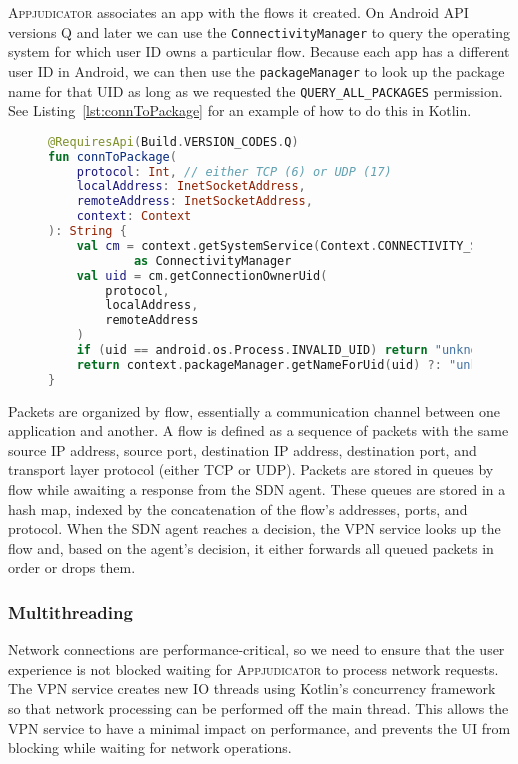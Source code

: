\textsc{Appjudicator} associates an app with the flows it created.  On Android
API versions Q and later we can use the \texttt{ConnectivityManager} to query
the operating system for which user ID owns a particular flow. Because each app
has a different user ID in Android, we can then use the \texttt{packageManager}
to look up the package name for that UID as long as we requested the
\texttt{QUERY\_ALL\_PACKAGES} permission. See Listing~\ref{lst:connToPackage}
for an example of how to do this in Kotlin.

\begin{figure}[h]
\begin{lstlisting}[caption={Source code to obtain the package that created a
		given network flow.},
	label={lst:connToPackage}, language=Kotlin]
@RequiresApi(Build.VERSION_CODES.Q)
fun connToPackage(
    protocol: Int, // either TCP (6) or UDP (17)
    localAddress: InetSocketAddress,
    remoteAddress: InetSocketAddress,
    context: Context
): String {
	val cm = context.getSystemService(Context.CONNECTIVITY_SERVICE)
			as ConnectivityManager
	val uid = cm.getConnectionOwnerUid(
		protocol,
		localAddress,
		remoteAddress
	)
	if (uid == android.os.Process.INVALID_UID) return "unknown"
	return context.packageManager.getNameForUid(uid) ?: "unknown"
}
\end{lstlisting}
\end{figure}

Packets are organized by flow, essentially a communication channel between one
application and another. A flow is defined as a sequence of packets with the
same source IP address, source port, destination IP address, destination port,
and transport layer protocol (either TCP or UDP). Packets are stored in queues
by flow while awaiting a response from the SDN agent. These queues are stored in
a hash map, indexed by the concatenation of the flow's addresses, ports, and
protocol. When the SDN agent reaches a decision, the VPN service looks up the
flow and, based on the agent's decision, it either forwards all queued packets
in order or drops them.

\subsubsection{Multithreading}
\label{sec:multithreading}

Network connections are performance-critical, so we need to ensure that the user
experience is not blocked waiting for \textsc{Appjudicator} to process network
requests. The VPN service creates new IO threads using Kotlin's concurrency
framework so that network processing can be performed off the main thread.
This allows the VPN service to have a minimal impact on performance, and
prevents the UI from blocking while waiting for network operations.

